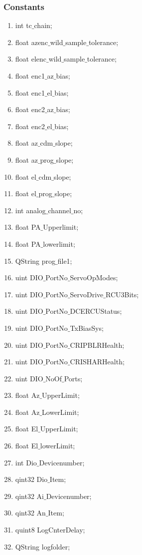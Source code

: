 \begin{enumerate}
\subsubsection{Constants}
\begin{enumerate}
	\item int tc$\_$chain;   
	\item float azenc$\_$wild$\_$sample$\_$tolerance;
	\item float elenc$\_$wild$\_$sample$\_$tolerance;
	\item float enc1$\_$az$\_$bias;
	\item float enc1$\_$el$\_$bias;
	\item float enc2$\_$az$\_$bias;
	\item float enc2$\_$el$\_$bias;
	\item float az$\_$cdm$\_$slope;
	\item float az$\_$prog$\_$slope;
	\item float el$\_$cdm$\_$slope;
	\item float el$\_$prog$\_$slope;
	\item int analog$\_$channel$\_$no; 
	\item float PA$\_$Upperlimit;
	\item float PA$\_$lowerlimit;
	\item QString prog$\_$file1;
	\item uint DIO$\_$PortNo$\_$ServoOpModes;
	\item uint DIO$\_$PortNo$\_$ServoDrive$\_$RCU3Bits;
	\item uint DIO$\_$PortNo$\_$DCERCUStatus;
	\item uint DIO$\_$PortNo$\_$TxBiasSys;
	\item uint DIO$\_$PortNo$\_$CRIPBLRHealth;
	\item uint DIO$\_$PortNo$\_$CRISHARHealth;
	\item uint DIO$\_$NoOf$\_$Ports;
	\item float Az$\_$UpperLimit;
	\item float Az$\_$LowerLimit;
	\item float El$\_$UpperLimit;
	\item float El$\_$lowerLimit;
	\item int Dio$\_$Devicenumber;
	\item qint32 Dio$\_$Item;
	\item qint32 Ai$\_$Devicenumber;
	\item qint32 An$\_$Item;
	\item quint8 LogCnterDelay;
	\item QString logfolder;	
\end{enumerate}


\end{enumerate}
